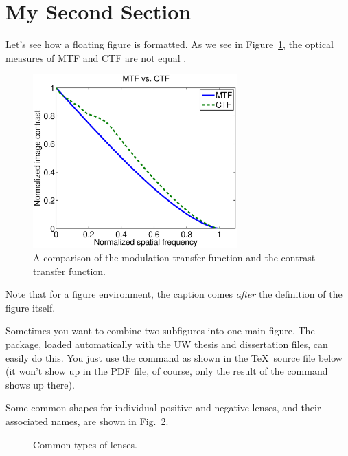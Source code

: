 \section{My Second Section}

Let's see how a floating figure is formatted.  As we see in
Figure~\ref{fg:ctf}, the optical measures of MTF and CTF are
not equal \cite{smith90}.
\begin{figure}
\centering
\includegraphics[width=0.7\textwidth]{ctf.eps}
\caption[MTF versus CTF.]{A comparison of the modulation transfer
function and the contrast transfer function.} \label{fg:ctf}%
\end{figure}
Note that for a figure environment, the caption comes \emph{after} the
definition of the figure itself.

Sometimes you want to combine two subfigures into one main figure.  The  package, loaded automatically with the UW thesis and dissertation files, can easily do this.  You just use the \pc{\subfloat} command as shown in the \TeX\ source file below (it won't show up in the PDF file, of course, only the result of the command shows up there).

Some common shapes for individual positive and negative lenses, and their associated names, are shown in Fig.~\ref{fg:lens_types}.  
\begin{figure}%
\centering
{}\qquad\qquad
{}
\caption{Common types of lenses.}
\label{fg:lens_types}
\end{figure}

